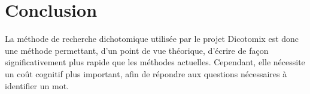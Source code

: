 \documentclass[twoside,twocolumn]{article}
\begin{document}

\section{Conclusion}

La méthode de recherche dichotomique utilisée par le projet Dicotomix est donc une méthode permettant, d'un point de vue théorique, d'écrire de façon significativement plus rapide que les méthodes actuelles. Cependant, elle nécessite un coût cognitif plus important, afin de répondre aux questions nécessaires à identifier un mot. 



 
%
\end{document}

